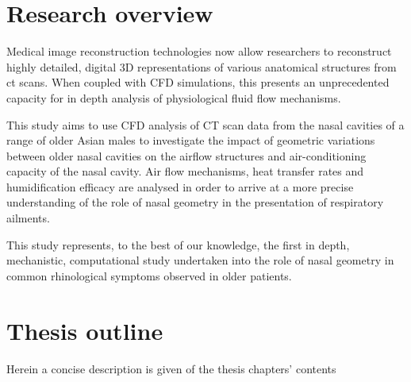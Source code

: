 \section{Research overview}

Medical image reconstruction technologies now allow researchers to reconstruct highly detailed, digital 3D representations of various anatomical structures from ct scans. When coupled with CFD simulations, this presents an unprecedented capacity for in depth analysis of physiological fluid flow mechanisms.

This study aims to use CFD analysis of CT scan data from the nasal cavities of a range of older Asian males to investigate the impact of geometric variations between older nasal cavities on the airflow structures and air-conditioning capacity of the nasal cavity. Air flow mechanisms, heat transfer rates and humidification efficacy are analysed in order to arrive at a more precise understanding of the role of nasal geometry in the presentation of respiratory ailments.

This study represents, to the best of our knowledge, the first in depth, mechanistic, computational study undertaken into the role of nasal geometry in common rhinological symptoms observed in older patients.

\section{Thesis outline}

Herein a concise description is given of the thesis chapters' contents

